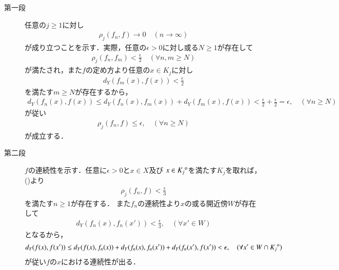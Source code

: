 	\begin{prf}\mbox{}
		\begin{description}
			\item[第一段]
				任意の$j \geq 1$に対し
				\begin{align}
					\rho_j(f_n,f) \longrightarrow 0
					\quad (n \longrightarrow \infty)
					\label{eq:completeness_and_separability_of_space_of_continuous_functions_4}
				\end{align}
				が成り立つことを示す．実際，任意の$\epsilon > 0$に対し或る$N \geq 1$が存在して
				\begin{align}
					\rho_j(f_n,f_m) < \frac{\epsilon}{2}
					\quad (\forall n,m \geq N)
				\end{align}
				が満たされ，また$f$の定め方より任意の$x \in K_j$に対し
				\begin{align}
					d_Y(f_m(x),f(x)) < \frac{\epsilon}{2}
				\end{align}
				を満たす$m \geq N$が存在するから，
				\begin{align}
					d_Y(f_n(x),f(x)) \leq d_Y(f_n(x),f_m(x)) + d_Y(f_m(x),f(x)) 
					< \frac{\epsilon}{2} + \frac{\epsilon}{2}
					= \epsilon,
					\quad (\forall n \geq N)
				\end{align}
				が従い
				\begin{align}
					\rho_j(f_n,f) \leq \epsilon,
					\quad (\forall n \geq N)
				\end{align}
				が成立する．
				
			\item[第二段]
				$f$の連続性を示す．任意に$\epsilon > 0$と$x \in X$及び
				$x \in {\kern0ptK_j}^{\mathrm{o}}$を満たす$K_j$を取れば，
				()より
				\begin{align}
					\rho_j(f_n,f) < \frac{\epsilon}{3}
				\end{align}
				を満たす$n \geq 1$が存在する．
				また$f_n$の連続性より$x$の或る開近傍$W$が存在して
				\begin{align}
					d_Y(f_n(x),f_n(x')) < \frac{\epsilon}{3},
					\quad (\forall x' \in W)
				\end{align}
				となるから，
				\begin{align}
					d_Y(f(x),f(x'))
					\leq d_Y(f(x),f_n(x)) + d_Y(f_n(x),f_n(x')) + d_Y(f_n(x'),f(x'))
					< \epsilon,
					\quad (\forall x' \in W \cap {\kern0ptK_j}^{\mathrm{o}})
				\end{align}
				が従い$f$の$x$における連続性が出る．
			

\end{description}
\end{prf}
